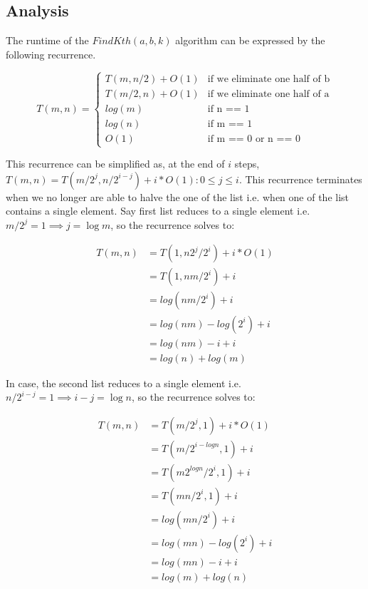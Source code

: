 \documentclass{article}
\begin{document}
    \subsection*{Analysis}
    The runtime of the $FindKth(a, b, k)$ algorithm can be expressed by the following recurrence.

    \begin{equation*}
        T(m, n) = 
        \begin{cases}
            T(m, n/2) + O(1) & \text{if we eliminate one half of b} \\
            T(m/2, n) + O(1) & \text{if we eliminate one half of a} \\
            log(m)           & \text{if n == 1} \\
            log(n)           & \text{if m == 1} \\
            O(1)             & \text{if m == 0 or n == 0}
        \end{cases}
    \end{equation*}

    This recurrence can be simplified as, at the end of $i$ steps, $T(m, n) = T(m/2^j, n/2^{i-j}) + i*O(1) : 0 \le j \le i$. This recurrence terminates when we no longer are able to halve the one of the list i.e. when one of the list contains a single element. Say first list reduces to a single element i.e. $m/2^j = 1 \implies j = \log m$, so the recurrence solves to:
    
    \begin{equation*}
        \begin{split}
            T(m, n) 
            & = T(1, n2^j/2^i) + i*O(1) \\
            & = T(1, nm/2^i) + i \\
            & = log(nm/2^i) + i \\
            & = log(nm) - log(2^i) + i \\
            & = log(nm) - i + i \\
            & = log(n) + log(m)
        \end{split}
    \end{equation*}

    In case, the second list reduces to a single element i.e. $n/2^{i-j} = 1 \implies i-j = \log n$, so the recurrence solves to:

    \begin{equation*}
        \begin{split}
            T(m, n) 
            & = T(m/2^j, 1) + i*O(1) \\
            & = T(m/2^{i-log n}, 1) + i \\
            & = T(m2^{log n}/2^i, 1) + i \\
            & = T(mn/2^i, 1) + i \\
            & = log(mn/2^i) + i \\
            & = log(mn) - log(2^i) + i \\
            & = log(mn) - i + i \\
            & = log(m) + log(n)
        \end{split}
    \end{equation*}
\end{document}
